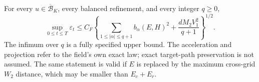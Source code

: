 \begin{theorem}
\label{thm:spectral-proof}
For every $u\in\overline{\mathcal B}_K$, every balanced refinement,
and every integer $q\ge0$,
\begin{equation}
 \boxed{\quad
 \sup_{0\le t\le T}\varepsilon_t
 \le C_F\left\{
   \sum_{1\le|\alpha|\le q+1}b_\alpha(E,H)^2
       +\frac{dM_2 V_1^2}{q+1}\right\}^{1/2}.
 \quad}
 \label{eq:spectral-bound}
\end{equation}
The infimum over $q$ is a fully specified upper bound. The acceleration and
projection refer to the field's own exact law; exact target-path
preservation is not assumed. The same statement is valid if $E$ is replaced
by the maximum cross-grid $W_2$ distance, which may be smaller than $E_c+E_r$.
\end{theorem}
